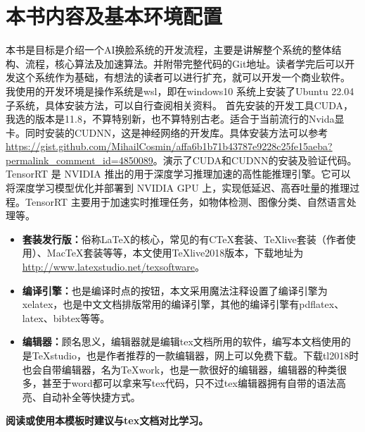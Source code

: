 \chapter{本书内容及基本环境配置}
本书是目标是介绍一个AI换脸系统的开发流程，主要是讲解整个系统的整体结构、流程，核心算法及加速算法。并附带完整代码的Git地址。读者学完后可以开发这个系统作为基础，有想法的读者可以进行扩充，就可以开发一个商业软件。
我使用的开发环境是操作系统是wsl，即在windows10 系统上安装了Ubuntu 22.04子系统，具体安装方法，可以自行查阅相关资料。
首先安装的开发工具CUDA，我选的版本是11.8，不算特别新，也不算特别古老。适合于当前流行的Nvida显卡。同时安装的CUDNN，这是神经网络的开发库。具体安装方法可以参考\url{https://gist.github.com/MihailCosmin/affa6b1b71b43787e9228c25fe15aeba?permalink_comment_id=4850089}。演示了CUDA和CUDNN的安装及验证代码。
TensorRT 是 NVIDIA 推出的用于深度学习推理加速的高性能推理引擎。它可以将深度学习模型优化并部署到 NVIDIA GPU 上，实现低延迟、高吞吐量的推理过程。TensorRT 主要用于加速实时推理任务，如物体检测、图像分类、自然语言处理等。

\begin{itemize}
\item \textbf{套装发行版：}俗称\LaTeX 的核心，常见的有CTeX套装、TeXlive套装（作者使用）、MacTeX套装等等，本文使用TeXlive2018版本，下载地址为\url{http://www.latexstudio.net/texsoftware}。

\item \textbf{编译引擎：}也是编译时点的按钮，本文采用魔法注释设置了编译引擎为xelatex，也是中文文档排版常用的编译引擎，其他的编译引擎有pdflatex、latex、bibtex等等。
 
\item \textbf{编辑器：}顾名思义，编辑器就是编辑tex文档所用的软件，编写本文档使用的是TeXstudio，也是作者推荐的一款编辑器，网上可以免费下载。下载tl2018时也会自带编辑器，名为TeXwork，也是一款很好的编辑器，编辑器的种类很多，甚至于word都可以拿来写tex代码，只不过tex编辑器拥有自带的语法高亮、自动补全等快捷方式。
\end{itemize}

\textbf{阅读或使用本模板时建议与tex文档对比学习。}

